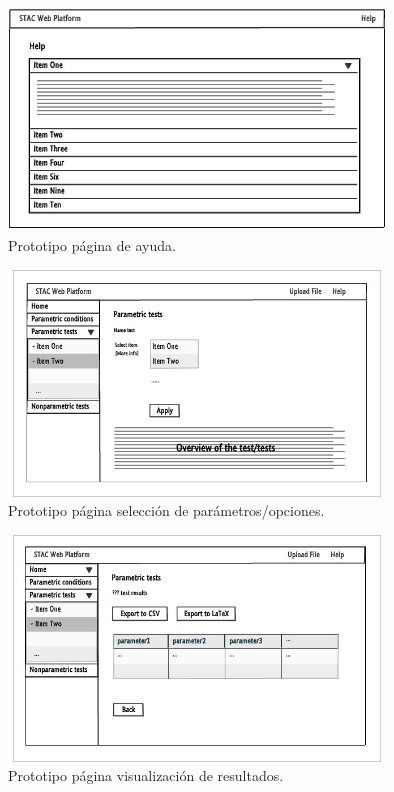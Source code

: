 \begin{figure}[H]
\centering
\includegraphics[width=10cm,height=6cm]{figuras/prototipo_help.jpg}
\caption{Prototipo página de ayuda.}
\label{fig:prot_help}
\end{figure}

\begin{figure}[H]
\centering
\includegraphics[width=10cm,height=6cm]{figuras/prototipo_test.jpg}
\caption{Prototipo página selección de parámetros/opciones.}
\label{fig:prot_test}
\end{figure}

\begin{figure}[H]
\centering
\includegraphics[width=10cm,height=6cm]{figuras/prototipo_results.jpg}
\caption{Prototipo página visualización de resultados.}
\label{fig:prot_results}
\end{figure}

